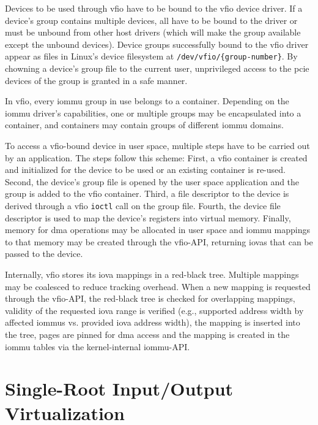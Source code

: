 Devices to be used through \ac{vfio} have to be bound to the \ac{vfio} device
driver. If a device's group contains multiple devices, all have to be bound to
the driver or must be unbound from other host drivers (which will make the group
available except the unbound devices). Device groups successfully bound to the
\ac{vfio} driver appear as files in Linux's device filesystem at
\texttt{/dev/vfio/\{group-number\}}. By chowning a device's group file to the
current user, unprivileged access to the \ac{pcie} devices of the group is
granted in a safe manner.

In \ac{vfio}, every \ac{iommu} group in use belongs to a container. Depending on
the \ac{iommu} driver's capabilities, one or multiple groups may be encapsulated
into a container, and containers may contain groups of different \ac{iommu}
domains.

To access a \ac{vfio}-bound device in user space, multiple steps have to be
carried out by an application. The steps follow this scheme: First, a \ac{vfio}
container is created and initialized for the device to be used or an existing
container is re-used. Second, the device's group file is opened by the
user space application and the group is added to the \ac{vfio} container. Third,
a file descriptor to the device is derived through a \ac{vfio} \texttt{ioctl}
call on the group file. Fourth, the device file descriptor is used to map the
device's registers into virtual memory. Finally, memory for \ac{dma} operations
may be allocated in user space and \ac{iommu} mappings to that memory may be
created through the \ac{vfio}-API, returning \acp{iova} that can be passed to
the device.

Internally, \ac{vfio} stores its \ac{iova} mappings in a red-black tree.
Multiple mappings may be coalesced to reduce tracking overhead. When a new
mapping is requested through the \ac{vfio}-API, the red-black tree is checked
for overlapping mappings, validity of the requested \ac{iova} range is verified
(e.g., supported address width by affected \acp{iommu} vs. provided \ac{iova}
address width), the mapping is inserted into the tree, pages are pinned for
\ac{dma} access and the mapping is created in the \ac{iommu} tables via the
kernel-internal \ac{iommu}-API.


\section{Single-Root Input/Output Virtualization}
\label{sec:sriov}


